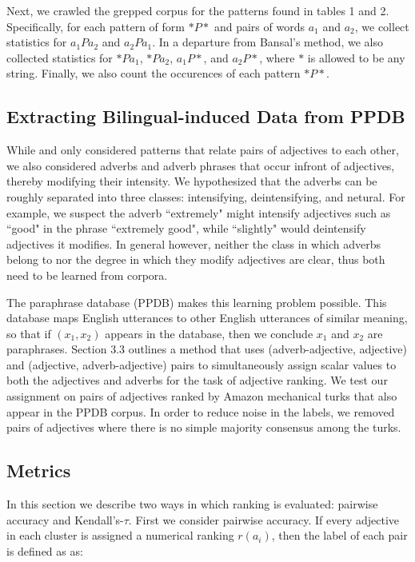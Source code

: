 Next, we crawled the grepped corpus for the patterns found in tables 1 and 2. Specifically, for each pattern of form $* P *$ and pairs of words $a_1$ and $a_2$, we collect statistics for $a_1 P a_2$ and $a_2 P a_1$. In a departure from Bansal's method, we also collected statistics for $* P a_1$, $* P a_2$, $a_1 P *$, and $a_2 P *$, where $*$ is allowed to be any string. Finally, we also count the occurences of each pattern $* P *$.

\subsection{Extracting Bilingual-induced Data from PPDB}

While  and  only considered patterns that relate pairs of adjectives to each other, we also considered adverbs and adverb phrases that occur infront of adjectives, thereby modifying their intensity. We hypothesized that the adverbs can be roughly separated into three classes: intensifying, deintensifying, and netural. For example, we suspect the adverb ``extremely" might intensify adjectives such as ``good" in the phrase ``extremely good", while ``slightly" would deintensify adjectives it modifies. In general however, neither the class in which adverbs belong to nor the degree in which they modify adjectives are clear, thus both need to be learned from corpora. 

The paraphrase database (PPDB) \cite{pavlick-EtAl:2015:ACL-IJCNLP3} makes this learning problem possible. This database maps English utterances to other English utterances of similar meaning, so that if $(x_1, x_2)$ appears in the database, then we conclude $x_1$ and $x_2$ are paraphrases. Section 3.3 outlines a method that uses (adverb-adjective, adjective) and (adjective, adverb-adjective) pairs to simultaneously assign scalar values to both the adjectives and adverbs for the task of adjective ranking. We test our assignment on pairs of adjectives ranked by Amazon mechanical turks that also appear in the PPDB corpus. In order to reduce noise in the labels, we removed pairs of adjectives where there is no simple majority consensus among the turks. 

\subsection{Metrics}

In this section we describe two ways in which ranking is evaluated: pairwise accuracy and Kendall's-$\tau$. First we consider pairwise accuracy. If every adjective in each cluster is assigned a numerical ranking $r(a_i)$, then the label of each pair is defined as as: 

